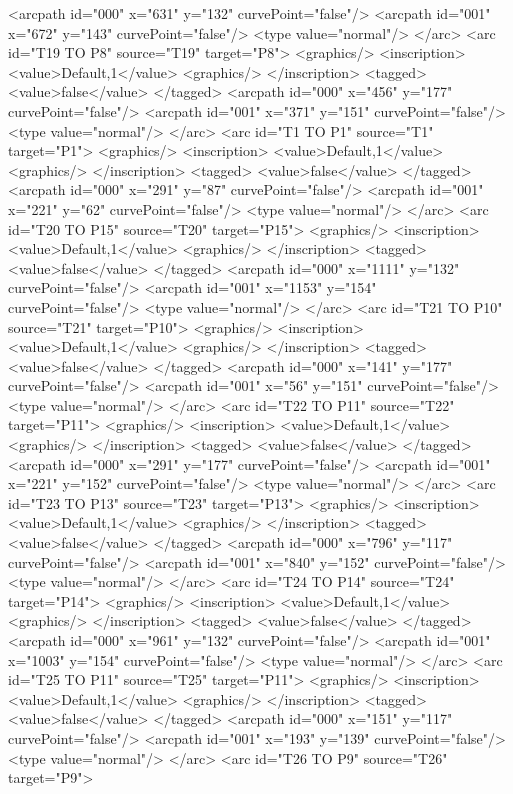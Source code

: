 <arcpath id="000" x="631" y="132" curvePoint="false"/>
<arcpath id="001" x="672" y="143" curvePoint="false"/>
<type value="normal"/>
</arc>
<arc id="T19 TO P8" source="T19" target="P8">
<graphics/>
<inscription>
<value>Default,1</value>
<graphics/>
</inscription>
<tagged>
<value>false</value>
</tagged>
<arcpath id="000" x="456" y="177" curvePoint="false"/>
<arcpath id="001" x="371" y="151" curvePoint="false"/>
<type value="normal"/>
</arc>
<arc id="T1 TO P1" source="T1" target="P1">
<graphics/>
<inscription>
<value>Default,1</value>
<graphics/>
</inscription>
<tagged>
<value>false</value>
</tagged>
<arcpath id="000" x="291" y="87" curvePoint="false"/>
<arcpath id="001" x="221" y="62" curvePoint="false"/>
<type value="normal"/>
</arc>
<arc id="T20 TO P15" source="T20" target="P15">
<graphics/>
<inscription>
<value>Default,1</value>
<graphics/>
</inscription>
<tagged>
<value>false</value>
</tagged>
<arcpath id="000" x="1111" y="132" curvePoint="false"/>
<arcpath id="001" x="1153" y="154" curvePoint="false"/>
<type value="normal"/>
</arc>
<arc id="T21 TO P10" source="T21" target="P10">
<graphics/>
<inscription>
<value>Default,1</value>
<graphics/>
</inscription>
<tagged>
<value>false</value>
</tagged>
<arcpath id="000" x="141" y="177" curvePoint="false"/>
<arcpath id="001" x="56" y="151" curvePoint="false"/>
<type value="normal"/>
</arc>
<arc id="T22 TO P11" source="T22" target="P11">
<graphics/>
<inscription>
<value>Default,1</value>
<graphics/>
</inscription>
<tagged>
<value>false</value>
</tagged>
<arcpath id="000" x="291" y="177" curvePoint="false"/>
<arcpath id="001" x="221" y="152" curvePoint="false"/>
<type value="normal"/>
</arc>
<arc id="T23 TO P13" source="T23" target="P13">
<graphics/>
<inscription>
<value>Default,1</value>
<graphics/>
</inscription>
<tagged>
<value>false</value>
</tagged>
<arcpath id="000" x="796" y="117" curvePoint="false"/>
<arcpath id="001" x="840" y="152" curvePoint="false"/>
<type value="normal"/>
</arc>
<arc id="T24 TO P14" source="T24" target="P14">
<graphics/>
<inscription>
<value>Default,1</value>
<graphics/>
</inscription>
<tagged>
<value>false</value>
</tagged>
<arcpath id="000" x="961" y="132" curvePoint="false"/>
<arcpath id="001" x="1003" y="154" curvePoint="false"/>
<type value="normal"/>
</arc>
<arc id="T25 TO P11" source="T25" target="P11">
<graphics/>
<inscription>
<value>Default,1</value>
<graphics/>
</inscription>
<tagged>
<value>false</value>
</tagged>
<arcpath id="000" x="151" y="117" curvePoint="false"/>
<arcpath id="001" x="193" y="139" curvePoint="false"/>
<type value="normal"/>
</arc>
<arc id="T26 TO P9" source="T26" target="P9">
